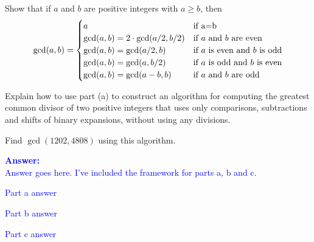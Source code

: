 \item{}
\begin{list}{\textbf{.}}{}
\item Show that if $a$ and $b$ are positive integers with $a\ge b$, then
\[
\gcd(a,b)=\begin{cases}
a & \textrm{if\ }$a=b$\\
\gcd(a,b)=2\cdot\gcd(a/2,b/2) & \textrm{if\ }a\textrm{\ and\ }b\textrm{\ are
even}\\
\gcd(a,b)=\gcd(a/2,b) & \textrm{if\ }a\textrm{\ is even and\ }b\textrm{\ is
odd}\\
\gcd(a,b)=\gcd(a,b/2) & \textrm{if\ }a\textrm{\ is odd and\ }b\textrm{\ is
even}\\
\gcd(a,b)=\gcd(a-b,b) & \textrm{if\ }a\textrm{\ and\ }b\textrm{\ are
odd}\\
\end{cases}
\]
\item Explain how to use part (a) to construct an algorithm for computing the
greatest common divisor of two positive integers that uses only comparisons,
subtractions and shifts of binary expansions, without using any divisions.
\item Find $\gcd(1202,4808)$ using this algorithm.
\end{list}
\vskip12pt
\ifanswers
\textcolor{blue}{
\textbf{Answer:}\\[6pt]
Answer goes here. I've included the framework for parts a, b and c.
\begin{list}{\textbf{.}}{}
  \item Part a answer
  \item Part b answer 
  \item Part c answer
\end{list}
}
\newpage
\fi
